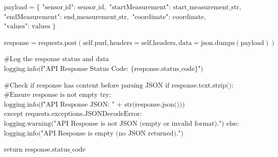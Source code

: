 \begin{algorithmic}[1]
	\STATE \hspace{1.0cm} $\text{payload} = \{$
	\STATE \hspace{1.5cm} $\text{"sensor\_id": sensor\_id},$
	\STATE \hspace{1.5cm} $\text{"startMeasurement": start\_measurement\_str},$
	\STATE \hspace{1.5cm} $\text{"endMeasurement": end\_measurement\_str},$
	\STATE \hspace{1.5cm} $\text{"coordinate": coordinate},$
	\STATE \hspace{1.5cm} $\text{"values": values}$
	\STATE \hspace{1.0cm} $\}$
	
	\STATE \hspace{1.0cm} $\text{response} = \text{requests.post}(\text{self.purl}, \text{headers} = \text{self.headers}, \text{data} = \text{json.dumps}(\text{payload}))$
	
	\STATE \hspace{1.0cm} $\text{\# Log the response status and data}$
	\STATE \hspace{1.0cm} $\text{logging.info(f"API Response Status Code: \{response.status\_code\}")}$
	
	\STATE \hspace{1.0cm} $\text{\#Check if response has content before parsing JSON}$
	\STATE \hspace{1.0cm} $\text{if response.text.strip():}$ $\text{\# Ensure response is not empty}$
	\STATE \hspace{1.5cm} $\text{try:}$
	\STATE \hspace{2.0cm} $\text{logging.info(f"API Response JSON: " + str(response.json()))}$
\STATE \hspace{1.5cm} $\text{except requests.exceptions.JSONDecodeError:}$
\STATE \hspace{2.0cm} $\text{logging.warning("API Response is not JSON (empty or invalid format).")}$
\STATE \hspace{1.0cm} $\text{else:}$
\STATE \hspace{1.5cm} $\text{logging.info("API Response is empty (no JSON returned).")}$

\STATE \hspace{1.0cm} $\text{return response.status\_code}$


\end{algorithmic}

